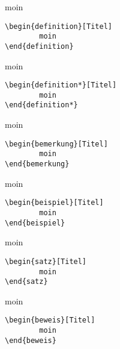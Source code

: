 \begingroup\begin{definition}[Titel]
moin
\begin{lstlisting}[language=lLatex]
\begin{definition}[Titel]
        moin
\end{definition}\end{lstlisting}
\end{definition}\endgroup

\begingroup\begin{definition*}[Titel]
moin
\begin{lstlisting}[language=lLatex]
\begin{definition*}[Titel]
        moin
\end{definition*}\end{lstlisting}
\end{definition*}\endgroup

\begingroup\begin{bemerkung}[Titel]
moin
\begin{lstlisting}[language=lLatex]
\begin{bemerkung}[Titel]
        moin
\end{bemerkung}\end{lstlisting}
\end{bemerkung}\endgroup

\begingroup\begin{beispiel}[Titel]
moin
\begin{lstlisting}[language=lLatex]
\begin{beispiel}[Titel]
        moin
\end{beispiel}\end{lstlisting}
\end{beispiel}\endgroup

\begingroup\begin{satz}[Titel]
moin
\begin{lstlisting}[language=lLatex]
\begin{satz}[Titel]
        moin
\end{satz}\end{lstlisting}
\end{satz}\endgroup


\begingroup\begin{beweis}[Titel]
moin
\begin{lstlisting}[language=lLatex]
\begin{beweis}[Titel]
        moin
\end{beweis}\end{lstlisting}
\end{beweis}\endgroup

